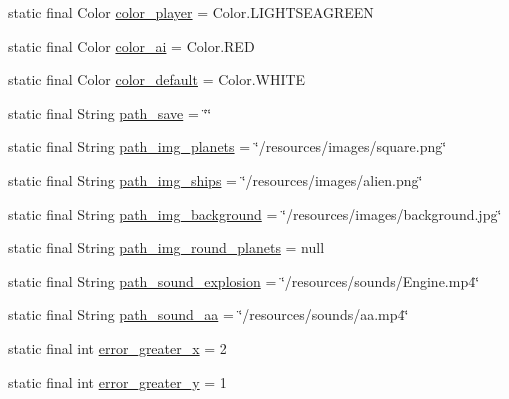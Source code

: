 \begin{DoxyCompactItemize}
\item 
static final Color \hyperlink{classfr_1_1projet_1_1groupe40_1_1util_1_1_constantes_a7ddd842b46d4a546232331097d5280b2}{color\+\_\+player} = Color.\+L\+I\+G\+H\+T\+S\+E\+A\+G\+R\+E\+EN
\item 
static final Color \hyperlink{classfr_1_1projet_1_1groupe40_1_1util_1_1_constantes_af0b6b302d1e2765fdfb9718036385e3c}{color\+\_\+ai} = Color.\+R\+ED
\item 
static final Color \hyperlink{classfr_1_1projet_1_1groupe40_1_1util_1_1_constantes_a846d5c141ee33283dcd1854275428a91}{color\+\_\+default} = Color.\+W\+H\+I\+TE
\item 
static final String \hyperlink{classfr_1_1projet_1_1groupe40_1_1util_1_1_constantes_adc35eacdfaca48bcc97da027ec46d0db}{path\+\_\+save} = \char`\"{}\char`\"{}
\item 
static final String \hyperlink{classfr_1_1projet_1_1groupe40_1_1util_1_1_constantes_afe0c37178c229c3881bf835bb16c45d8}{path\+\_\+img\+\_\+planets} = \char`\"{}/resources/images/square.\+png\char`\"{}
\item 
static final String \hyperlink{classfr_1_1projet_1_1groupe40_1_1util_1_1_constantes_a8b2368e6628d7a454badd705097242cd}{path\+\_\+img\+\_\+ships} = \char`\"{}/resources/images/alien.\+png\char`\"{}
\item 
static final String \hyperlink{classfr_1_1projet_1_1groupe40_1_1util_1_1_constantes_ac6bcb73d6876b90d9f1ffd17f0591ce5}{path\+\_\+img\+\_\+background} = \char`\"{}/resources/images/background.\+jpg\char`\"{}
\item 
static final String \hyperlink{classfr_1_1projet_1_1groupe40_1_1util_1_1_constantes_ae140c3640e847487363a59291d33fd8c}{path\+\_\+img\+\_\+round\+\_\+planets} = null
\item 
static final String \hyperlink{classfr_1_1projet_1_1groupe40_1_1util_1_1_constantes_ab2e1584ef3a7dec746947bc3797856c7}{path\+\_\+sound\+\_\+explosion} = \char`\"{}/resources/sounds/Engine.\+mp4\char`\"{}
\item 
static final String \hyperlink{classfr_1_1projet_1_1groupe40_1_1util_1_1_constantes_a1c4f9406019ba0070d7e8ac01c8da8c2}{path\+\_\+sound\+\_\+aa} = \char`\"{}/resources/sounds/aa.\+mp4\char`\"{}
\item 
static final int \hyperlink{classfr_1_1projet_1_1groupe40_1_1util_1_1_constantes_a62db33b20e7538cc4db4de9aa26a9188}{error\+\_\+greater\+\_\+x} = 2
\item 
static final int \hyperlink{classfr_1_1projet_1_1groupe40_1_1util_1_1_constantes_aba6dabe9122cbaf1e580700e1583c39d}{error\+\_\+greater\+\_\+y} = 1

\end{DoxyCompactItemize}
